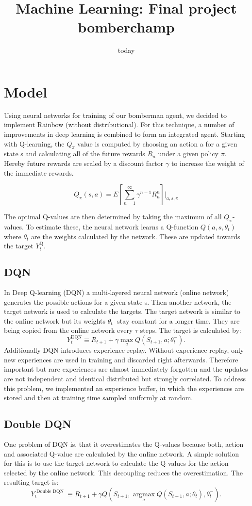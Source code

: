\documentclass[12pt]{article}
\title{Machine Learning: Final project bomberchamp}
\date{today}
\begin{document}
\section{Model}
Using neural networks for training of our bomberman agent, we decided to implement Rainbow (without distributional). For this technique, a number of improvements in deep learning is combined to form an integrated agent. Starting with Q-learning, the $Q_\pi$ value is computed by choosing an action a for a given state s and calculating all of the future rewards $R_n$ under a given policy $\pi$.
Hereby future rewards are scaled by a discount factor $\gamma$ to increase the weight of the immediate rewards.

\begin{equation}
Q_\pi(s,a)= E\left[\sum_{n=1}^{\infty} \gamma^{n-1}R_n^n\right] \Bigg|_{a,s,\pi}
\end{equation}

The optimal Q-values are then determined by taking the maximum of all $Q_\pi$-values.
To estimate these, the neural network learns a Q-function $Q(a, s, \theta_t)$ where $\theta_t$ are the weights calculated by the network.
These are updated towards the target $Y_{t}^{\mathrm{Q}}$.
\subsection{DQN}
In Deep Q-learning (DQN) a multi-layered neural network (online network) generates the possible actions for a given state s. Then another network, the target network is used to calculate the targets.
The target network is similar to the online network but its weights $\theta_t^-$ stay constant for a longer time. They are being copied from the online network every $\tau$ steps.
The target is calculated by:
\begin{equation}
Y_{t}^{\mathrm{DQN}} \equiv R_{t+1}+\gamma \max _{a} Q\left(S_{t+1}, a ; \theta_{t}^{-}\right).
\end{equation}
Additionally DQN introduces experience replay. Without experience replay, only new experiences are used in training and discarded right afterwards.
Therefore important but rare experiences are almost immediately forgotten and the updates are not independent and identical distributed but strongly correlated.
To address this problem, we implemented an experience buffer, in which the experiences are stored and then at training time sampled uniformly at random.
\subsection{Double DQN}
One problem of DQN is, that it overestimates the Q-values because both, action and associated Q-value are calculated by the online network.
A simple solution for this is to use the target network to calculate the Q-values for the action selected by the online network. This decoupling reduces the overestimation.
The resulting target is:
\begin{equation}
Y_{t}^{\text { Double DQN }} \equiv R_{t+1}+\gamma Q\left(S_{t+1}, \underset{a}{\operatorname{argmax}} Q\left(S_{t+1}, a ; \theta_{t}\right), \theta_{t}^{-}\right).
\end{equation}
\cite{DBLP:journals/corr/HasseltGS15}
\end{document}
